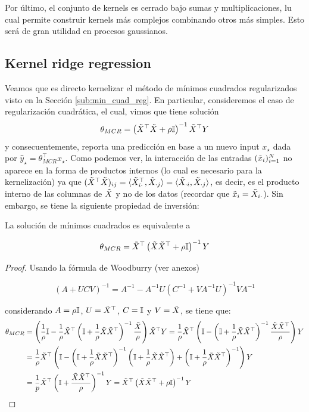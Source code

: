Por último, el conjunto de kernels es cerrado bajo sumas y multiplicaciones, lu cual permite construir kernels más complejos combinando otros más simples. Esto será de gran utilidad en procesos gaussianos.

\subsection{Kernel ridge regression}

Veamos que es directo kernelizar el método de mínimos cuadrados regularizados visto en la Sección \ref{sub:min_cuad_reg}. En particular, consideremos el caso de regularización cuadrática, el cual, vimos que tiene solución
\begin{equation}
    \theta_{MCR} = \left(\tilde{X}^\top\tilde{X} +\rho {\mathbb I}\right)^{-1} \tilde{X}^\top Y
    \label{eq:RR_soln1}
\end{equation}
 y consecuentemente, reporta una predicción en base a un nuevo input $x_\star$ dada por $\hat{y}_\star = \theta_{MCR}^\top x_\star$. Como podemos ver, la interacción de las entradas $(\tilde{x}_i)_{i=1}^N$ no aparece en la forma de productos internos (lo cual es necesario para la kernelización) ya que $(\tilde{X}^\top\tilde{X})_{ij}=\langle\tilde{X}^\top_{i\cdot},\tilde{X}_{\cdot j}\rangle=\langle\tilde{X}_{\cdot i},\tilde{X}_{\cdot j}\rangle$, es decir, es el producto interno de las columnas de $\tilde{X}$ y no de los datos (recordar que $\tilde{x}_i = \tilde{X}_{i\cdot}$). Sin embargo, se tiene la siguiente propiedad de inversión:

\begin{lemma} La solución de mínimos cuadrados es equivalente a

\begin{equation}
	\theta_{MCR} = \tilde{X}^\top\left(\tilde{X}\tilde{X}^\top + \rho{\mathbb I}\right)^{-1}Y
	\label{eq:RR_soln2}
\end{equation}

\end{lemma}

\begin{proof}
	Usando la fórmula de Woodburry (ver anexos)
	
	\begin{equation}
		(A+UCV)^{-1} = A^{-1} - A^{-1}U(C^{-1}+VA^{-1}U)^{-1}VA^{-1}
	\end{equation}
	
considerando $A=\rho{\mathbb I}$, $U=\tilde{X}^\top$, $C={\mathbb I}$ y $V=\tilde{X}$, se tiene que:
\begin{align}
	\theta_{MCR} &= \left(\frac{1}{\rho}{\mathbb I}- \frac{1}{\rho}\tilde{X}^\top\left({\mathbb I}+\frac{1}{\rho}\tilde{X}\tilde{X}^\top\right)^{-1}\frac{\tilde{X}}{\rho}\right)\tilde{X}^\top Y=\frac{1}{\rho}\tilde{X}^\top \left({\mathbb I}- \left({\mathbb I}+\frac{1}{\rho}\tilde{X}\tilde{X}^\top\right)^{-1}\frac{\tilde{X}\tilde{X}^\top}{\rho}\right)Y\\
	&= \frac{1}{\rho}\tilde{X}^\top \left({\mathbb I}- \left({\mathbb I}+\frac{1}{\rho}\tilde{X}\tilde{X}^\top\right)^{-1}\left({\mathbb I}+\frac{1}{\rho}\tilde{X}\tilde{X}^\top\right) + \left({\mathbb I}+\frac{1}{\rho}\tilde{X}\tilde{X}^\top\right)^{-1}\right)Y\\
	&= \frac{1}{p}\tilde{X}^\top\left({\mathbb I}+\frac{\tilde{X}\tilde{X}^\top}{\rho}\right)^{-1}Y= \tilde{X}^\top\left(\tilde{X}\tilde{X}^\top + \rho{\mathbb I}\right)^{-1}Y
\end{align}
\end{proof}

